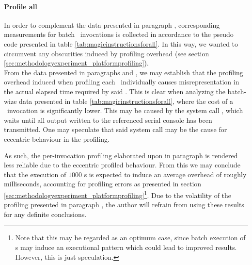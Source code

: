 

\paragraph{Profile all}
\label{par:results_magicinstructionoverhead_profileall}
In order to complement the data presented in paragraph , corresponding measurements for batch \dvttermmagicinstruction\ invocations is collected in accordance to the pseudo code presented in table \ref{tab:magicinstructionsforall}.
In this way, we wanted to circumvent any obscurities induced by profiling overhead (see section \ref{sec:methodologyexperiment_platformprofiling}).\\



\noindent
From the data presented in paragraphs  and , we may establish that the profiling overhead induced when profiling each \dvttermmagicinstruction\ individually causes misrepresentation in the actual elapsed time required by said \dvttermmagicinstruction .
This is clear when analyzing the batch-wize data presented in table \ref{tab:magicinstructionsforall}, where the cost of a \dvttermmagicinstruction\ invocation is significantly lower.
This may be caused by the system call , which	waits until all output written to the referenced serial console has been transmitted.
One may speculate that said system call may be the cause for eccentric behaviour in the profiling.

As such, the per-invocation profiling elaborated upon in paragraph  is rendered less reliable due to the eccentric profiled behaviour.
From this we may conclude that the execution of $1000$ \dvttermmagicinstruction s is expected to induce an average overhead of roughly  milliseconds, accounting for profiling errors as presented in section \ref{sec:methodologyexperiment_platformprofiling}\footnote{Note that this may be regarded as an optimum case, since batch execution of \dvttermmagicinstruction s may induce an executional pattern which could lead to improved results. However, this is just speculation.}.
Due to the volatility of the profiling presented in paragraph , the author will refrain from using these results for any definite conclusions.
